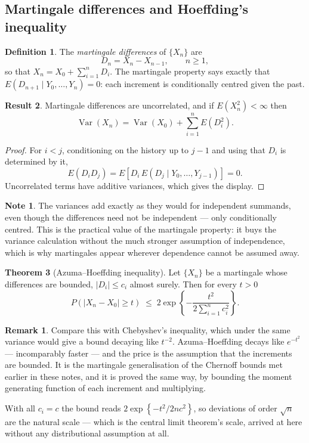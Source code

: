 \documentclass[11pt,a4paper]{article}
\theoremstyle{definition}
\newtheorem{thm}{Theorem}[subsection]
\newtheorem{defn}[thm]{Definition}
\newtheorem{result}[thm]{Result}
\newtheorem*{note}{Note}
\newtheorem*{remark}{Remark}
\DeclareMathOperator{\Var}{Var}
\begin{document}
\subsection{Martingale differences and Hoeffding's inequality}

\begin{defn}
The \emph{martingale differences} of $\{X_n\}$ are
$$D_n = X_n - X_{n-1},\qquad n\geq 1,$$
so that $X_n = X_0 + \sum_{i=1}^{n}D_i$. The martingale property says exactly
that $E\left(D_{n+1}\mid Y_0,\dots,Y_n\right)=0$: each increment is
conditionally centred given the past.
\end{defn}

\begin{result}
Martingale differences are uncorrelated, and if $E\left(X_n^{2}\right)<\infty$
then
$$\Var(X_n) = \Var(X_0) + \sum_{i=1}^{n}E\left(D_i^{2}\right).$$
\end{result}

\begin{proof}
For $i<j$, conditioning on the history up to $j-1$ and using that $D_i$ is
determined by it,
$$E\left(D_iD_j\right) = E\left[D_i\,E\left(D_j\mid Y_0,\dots,Y_{j-1}\right)\right] = 0 .$$
Uncorrelated terms have additive variances, which gives the display.
\end{proof}

\begin{note}
The variances add exactly as they would for independent summands, even though
the differences need not be independent --- only conditionally centred. This is
the practical value of the martingale property: it buys the variance
calculation without the much stronger assumption of independence, which is why
martingales appear wherever dependence cannot be assumed away.
\end{note}

\begin{thm}[Azuma--Hoeffding inequality]
Let $\{X_n\}$ be a martingale whose differences are bounded,
$\left|D_i\right|\leq c_i$ almost surely. Then for every $t>0$
$$P\left(\left|X_n - X_0\right| \geq t\right)
\;\leq\; 2\exp\left\{-\frac{t^{2}}{2\sum_{i=1}^{n}c_i^{2}}\right\}.$$
\end{thm}

\begin{remark}
Compare this with Chebyshev's inequality, which under the same variance would
give a bound decaying like $t^{-2}$. Azuma--Hoeffding decays like
$e^{-t^{2}}$ --- incomparably faster --- and the price is the assumption that
the increments are bounded. It is the martingale generalisation of the Chernoff
bounds met earlier in these notes, and it is proved the same way, by bounding
the moment generating function of each increment and multiplying.

With all $c_i=c$ the bound reads
$2\exp\left\{-t^{2}/2nc^{2}\right\}$, so deviations of order $\sqrt{n}$ are the
natural scale --- which is the central limit theorem's scale, arrived at here
without any distributional assumption at all.
\end{remark}
\end{document}

